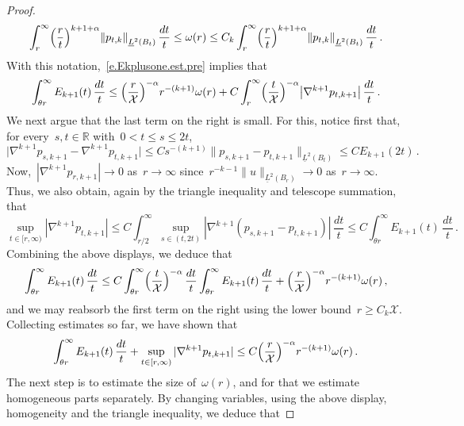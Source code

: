 \documentclass[11pt,twoside]{article} %
\numberwithin{equation}{section}
\theoremstyle{definition}
\let\originalleft\left
\let\originalright\right
\renewcommand{\left}{\mathopen{}\mathclose\bgroup\originalleft}
\renewcommand{\right}{\aftergroup\egroup\originalright}
\newcommand*{\R}{\ensuremath{\mathbb{R}}}
\newcommand{\X}{\mathcal{X}}
\begin{document}
\begin{proof}
\begin{equation*}
\int_{r}^\infty \Bigl( \frac{r}{t} \Bigr)^{k+1+\alpha} \left\| p_{t,k} \right\|_{\underline{L}^2(B_t)} \, \frac{dt}{t}  
\leq 
\omega(r) 
\leq 
C_k \int_{r}^\infty \Bigl( \frac{r}{t} \Bigr)^{k+1+\alpha} \left\| p_{t,k} \right\|_{\underline{L}^2(B_t)} \, \frac{dt}{t}  
 \,.
\end{equation*}
With this notation,~\eqref{e.Ekplusone.est.pre} implies that
\begin{equation} \label{e.Ekplusone.est} 
\int_{\theta r}^\infty E_{k+1}(t) \, \frac{dt}{t} 
\leq  
\Bigl( \frac{r}{\X} \Bigr)^{-\alpha} r^{-(k+1)} \omega(r)
+
C \int_{r}^\infty \Bigl( \frac{t}{\X} \Bigr)^{-\alpha} \bigl | \nabla^{k+1} p_{t,k+1} \bigr | \, \frac{dt}{t} 
\,.
\end{equation}
We next argue that the last term on the right is small. For this, notice first that, for every~$s,t \in \R$ with~$0< t \leq s \leq 2t$, 
\begin{equation*} %
\bigl| \nabla^{k+1} p_{s,k+1} - \nabla^{k+1}  p_{t,k+1} \bigr|
\leq 
Cs^{-(k+1)}\| p_{s,k+1} - p_{t,k+1} \|_{\underline{L}^2(B_t)} 
\leq
C E_{k+1}(2t) \,.
\end{equation*}
Now,~$|\nabla^{k+1} p_{r,k+1}| \to 0$ as~$r\to \infty$ since~$r^{-k-1} \| u \|_{\underline{L}^{2}(B_r)} \to 0$ as~$r \to \infty$. Thus, we also obtain, again by the triangle inequality and telescope summation, that
\begin{equation*}  
\sup_{t \in [r ,\infty) }|\nabla^{k+1} p_{t,k+1}| 
\leq 
C \int_{r/2}^\infty \sup_{s \in (t,2t)} |\nabla^{k+1} (p_{s,k+1} - p_{t,k+1}) | \, \frac{dt}{t}    
\leq 
C \int_{\theta r}^\infty E_{k+1}(t) \, \frac{dt}{t}
\,.
\end{equation*} 
Combining the above displays, we deduce that
\begin{equation} \label{e.Ekplusone.est.again}
\int_{\theta r}^\infty E_{k+1}(t) \, \frac{dt}{t}  
\leq 
C \int_{\theta r}^\infty \Bigl( \frac{t}{\X} \Bigr)^{-\alpha}  \, \frac{dt}{t}  
\int_{\theta r}^\infty E_{k+1}(t) \, \frac{dt}{t}  
+
\Bigl( \frac{r}{\X} \Bigr)^{-\alpha} r^{-(k+1)} \omega(r)
\,,
\end{equation}
and we may reabsorb the first term on the right using the lower bound~$r \geq C_k \X$. Collecting estimates so far, we have shown that
\begin{equation}  
\int_{\theta r}^\infty E_{k+1}(t) \, \frac{dt}{t} + \sup_{t \in [r ,\infty) }|\nabla^{k+1} p_{t,k+1}| 
\leq   
C \Bigl( \frac{r}{\X} \Bigr)^{-\alpha} r^{-(k+1)} \omega(r)  \,.
\end{equation}
The next step is to estimate the size of~$\omega(r)$, and for that we estimate homogeneous parts separately. By changing variables, using the above display, homogeneity and the triangle inequality, we deduce that

\end{proof}
\end{document}

